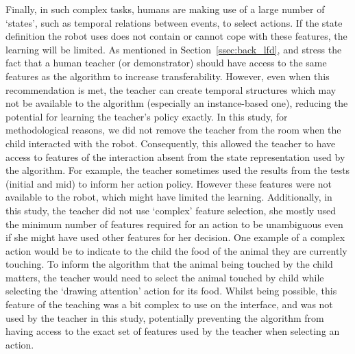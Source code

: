 Finally, in such complex tasks, humans are making use of a large number of `states', such as temporal relations between events, to select actions. If the state definition the robot uses does not contain or cannot cope with these features, the learning will be limited. As mentioned in Section~\ref{ssec:back_lfd}, \cite{knox2014learning} and \cite{sequeira2016discovering} stress the fact that a human teacher (or demonstrator) should have access to the same features as the algorithm to increase transferability. However, even when this recommendation is met, the teacher can create temporal structures which may not be available to the algorithm (especially an instance-based one), reducing the potential for learning the teacher's policy exactly. In this study, for methodological reasons, we did not remove the teacher from the room when the child interacted with the robot. Consequently, this allowed the teacher to have access to features of the interaction absent from the state representation used by the algorithm. For example, the teacher sometimes used the results from the tests (initial and mid) to inform her action policy. However these features were not available to the robot, which might have limited the learning. Additionally, in this study, the teacher did not use `complex' feature selection, she mostly used the minimum number of features required for an action to be unambiguous even if she might have used other features for her decision. One example of a complex action would be to indicate to the child the food of the animal they are currently touching. To inform the algorithm that the animal being touched by the child matters, the teacher would need to select the animal touched by child while selecting the `drawing attention' action for its food. Whilst being possible, this feature of the teaching was a bit complex to use on the interface, and was not used by the teacher in this study, potentially preventing the algorithm from having access to the exact set of features used by the teacher when selecting an action.



